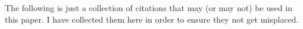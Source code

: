 \documentclass[10pt]{./IEEEtran}
\begin{document}
%





The following is just a collection of citations that may (or may not) be used in this paper.  I have collected them here in order to ensure they not get misplaced.
\cite{Hui:2011}\cite{Liu:2009}\cite{Vahdat:2000}\cite{Gross:2006}\cite{Fu:2003}\cite{Ganesh:2005}
\cite{Bent2009}\cite{Bent:2008}\cite{Toce:2011}\cite{Sonnenberg:2009}





%
%





\end{document}
